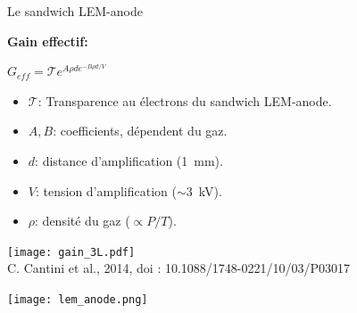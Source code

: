     \begin{frame}{Le sandwich LEM-anode}
	   		\begin{minipage}{0.48\textwidth}
	   			\begin{scriptsize}
		   			\textbf{Gain effectif:}\\
		   		\end{scriptsize}
	   			$G_{eff} = \mathcal{T}e^{A\rho d e^{-B\rho d/V}}$\\
	   			\begin{scriptsize}
	    			\begin{itemize}
	    				\item $\mathcal{T}$: Transparence au électrons du sandwich LEM-anode.
	    				\item $A,B$: coefficients, dépendent du gaz.
	    				\item $d$: distance d'amplification (\SI{1}{\milli\meter}).
	    				\item $V$: tension d'amplification ($\sim$\SI{3}{\kilo\volt}).
	    				\item $\rho$: densité du gaz ($\propto P/T$).
	    			\end{itemize}
	    		\end{scriptsize} 
	   			\vfill
                \centering
				\texttt{[image: gain\_3L.pdf]}\\\tiny{C. Cantini et al., 2014, doi : 10.1088/1748-0221/10/03/P03017}
	   		\end{minipage}\hfill
	   		\begin{minipage}{0.48\textwidth}
	   			\texttt{[image: lem\_anode.png]}
	   		\end{minipage}
    \end{frame}
    

